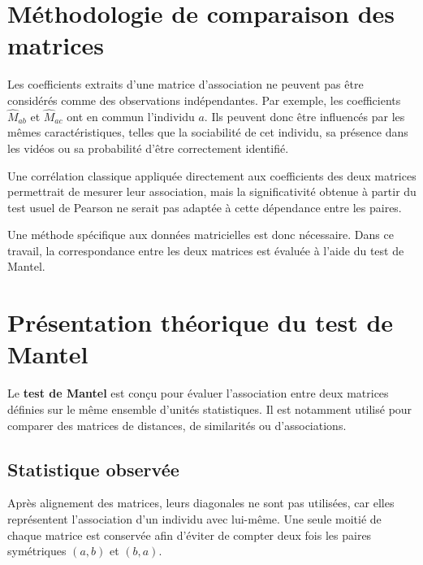 \documentclass[11pt,a4paper]{report}
\begin{document}
\section{Méthodologie de comparaison des matrices}
\label{sec:methode_comparaison}

Les coefficients extraits d'une matrice d'association ne peuvent pas
être considérés comme des observations indépendantes. Par exemple, les
coefficients $\widehat{M}_{ab}$ et $\widehat{M}_{ac}$ ont en commun l'individu
$a$. Ils peuvent donc être influencés par les mêmes caractéristiques,
telles que la sociabilité de cet individu, sa présence dans les vidéos
ou sa probabilité d'être correctement identifié.

Une corrélation classique appliquée directement aux coefficients des
deux matrices permettrait de mesurer leur association, mais la
significativité obtenue à partir du test usuel de Pearson ne serait pas
adaptée à cette dépendance entre les paires.

Une méthode spécifique aux données matricielles est donc nécessaire.
Dans ce travail, la correspondance entre les deux matrices est évaluée
à l'aide du test de Mantel.


\section{Présentation théorique du test de Mantel}
\label{sec:test_mantel}

Le \textbf{test de Mantel} \citep{mantel1967} est conçu pour évaluer
l'association entre deux matrices définies sur le même ensemble
d'unités statistiques. Il est notamment utilisé pour comparer des
matrices de distances, de similarités ou d'associations.

\subsection*{Statistique observée}

Après alignement des matrices, leurs diagonales ne sont pas utilisées,
car elles représentent l'association d'un individu avec lui-même. Une
seule moitié de chaque matrice est conservée afin d'éviter de compter
deux fois les paires symétriques $(a,b)$ et $(b,a)$.
\end{document}
